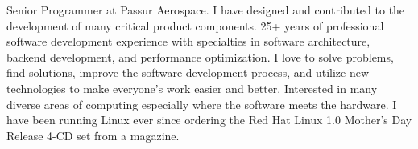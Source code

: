 
\begin{cvparagraph}
Senior Programmer at Passur Aerospace. I have designed and contributed to the development of many critical product components. 25+ years of professional software development experience with specialties in software architecture, backend development, and performance optimization. I love to solve problems, find solutions, improve the software development process, and utilize new technologies to make everyone's work easier and better. Interested in many diverse areas of computing especially where the software meets the hardware. I have been running Linux ever since ordering the Red Hat Linux 1.0 Mother's Day Release 4-CD set from a magazine.
\end{cvparagraph}
